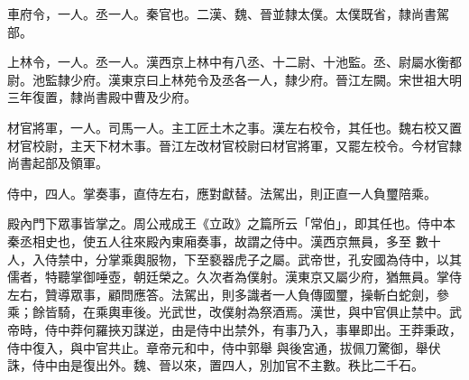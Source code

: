\begin{pinyinscope}
 車府令，一人。丞一人。秦官也。二漢、魏、晉並隸太僕。太僕既省，隸尚書駕部。



 上林令，一人。丞一人。漢西京上林中有八丞、十二尉、十池監。丞、尉屬水衡都尉。池監隸少府。漢東京曰上林苑令及丞各一人，隸少府。晉江左闕。宋世祖大明三年復置，隸尚書殿中曹及少府。



 材官將軍，一人。司馬一人。主工匠土木之事。漢左右校令，其任也。魏右校又置材官校尉，主天下材木事。晉江左改材官校尉曰材官將軍，又罷左校令。今材官隸尚書起部及領軍。



 侍中，四人。掌奏事，直侍左右，應對獻替。法駕出，則正直一人負璽陪乘。



 殿內門下眾事皆掌之。周公戒成王《立政》之篇所云「常伯」，即其任也。侍中本秦丞相史也，使五人往來殿內東廂奏事，故謂之侍中。漢西京無員，多至
 數十人，入侍禁中，分掌乘輿服物，下至褻器虎子之屬。武帝世，孔安國為侍中，以其儒者，特聽掌御唾壺，朝廷榮之。久次者為僕射。漢東京又屬少府，猶無員。掌侍左右，贊導眾事，顧問應答。法駕出，則多識者一人負傳國璽，操斬白蛇劍，參乘；餘皆騎，在乘輿車後。光武世，改僕射為祭酒焉。漢世，與中官俱止禁中。武帝時，侍中莽何羅挾刃謀逆，由是侍中出禁外，有事乃入，事畢即出。王莽秉政，侍中復入，與中官共止。章帝元和中，侍中郭舉
 與後宮通，拔佩刀驚御，舉伏誅，侍中由是復出外。魏、晉以來，置四人，別加官不主數。秩比二千石。



\end{pinyinscope}